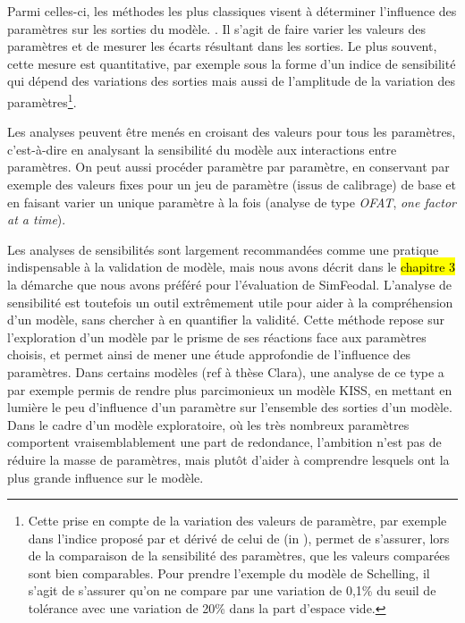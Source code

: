 Parmi celles-ci, les méthodes les plus classiques \autocite[257]{crooks_agent-based_2019} visent à \og déterminer l'influence des paramètres sur les sorties du modèle.\fg{} \autocite[75]{ginot2005explorer}.
Il s'agit de faire varier les valeurs des paramètres et de mesurer les écarts résultant dans les sorties.
Le plus souvent, cette mesure est quantitative, par exemple sous la forme d'un \og indice de sensibilité\fg{} qui dépend des variations des sorties mais aussi de l'amplitude de la variation des paramètres\footnote{
	Cette prise en compte de la variation des valeurs de paramètre, par exemple dans l'indice proposé par \textcite[258]{crooks_agent-based_2019} et dérivé de celui de \textcite{hamby_review_1994} (in \cite[201]{osullivan_spatial_2013}), permet de s'assurer, lors de la comparaison de la sensibilité des paramètres, que les valeurs comparées sont bien comparables.
	Pour prendre l'exemple du modèle de Schelling, il s'agit de s'assurer qu'on ne compare par une variation de 0,1\% du seuil de tolérance avec une variation de 20\% dans la part d'espace vide.
}.

Les analyses peuvent être menés en croisant des valeurs pour tous les paramètres, c'est-à-dire en analysant la sensibilité du modèle aux interactions entre paramètres.
On peut aussi procéder paramètre par paramètre, en conservant par exemple des valeurs fixes pour un jeu de paramètre (issus de calibrage) de base et en faisant varier un unique paramètre à la fois (analyse de type \textit{OFAT}, \og \textit{one factor at a time}\fg{}).

Les analyses de sensibilités sont largement recommandées comme une pratique indispensable à la validation de modèle, mais nous avons décrit dans le \hl{chapitre 3} la démarche que nous avons préféré pour l'évaluation de SimFeodal.
L'analyse de sensibilité est toutefois un outil extrêmement utile pour aider à la compréhension d'un modèle, sans chercher à en quantifier la validité.
Cette méthode repose sur l'exploration d'un modèle par le prisme de ses réactions face aux paramètres choisis, et permet ainsi de mener une étude approfondie de l'influence des paramètres.
Dans certains modèles (ref à thèse Clara), une analyse de ce type a par exemple permis de rendre plus parcimonieux un modèle KISS, en mettant en lumière le peu d'influence d'un paramètre sur l'ensemble des sorties d'un modèle.
Dans le cadre d'un modèle exploratoire, où les très nombreux paramètres comportent vraisemblablement une part de redondance, l'ambition n'est pas de réduire la masse de paramètres, mais plutôt d'aider à comprendre lesquels ont la plus grande influence sur le modèle.

